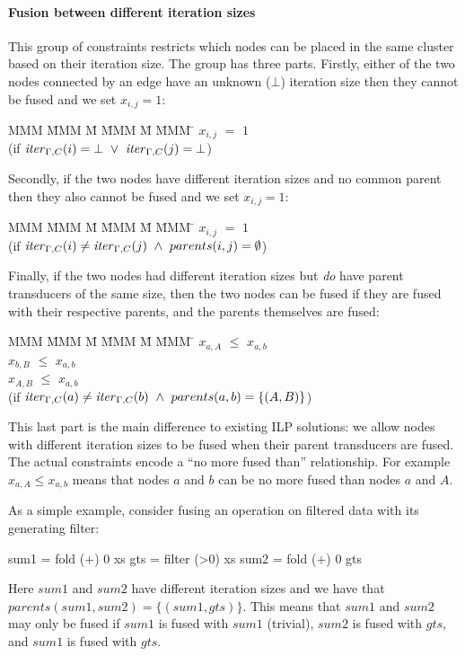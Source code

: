 \paragraph{Fusion between different iteration sizes} This group of constraints restricts which nodes can be placed in the same cluster based on their iteration size. The group has three parts. 
Firstly, either of the two nodes connected by an edge have an unknown ($\bot$) iteration size then they cannot be fused and we set $x_{i,j} = 1$:
\begin{tabbing}
MMM     \= MMM \= M \= MMM \= M \= MMM \= \kill
        \> $x_{i,j}$   \> $=$   \> $1$          \>       \>     \\
        \> (if $\mathit{iter}_{\Gamma,C}(i) = \bot 
                ~\vee~ \mathit{iter}_{\Gamma,C}(j) = \bot$)
\end{tabbing}
Secondly, if the two nodes have different iteration sizes and no common parent then they also cannot be fused and we set $x_{i,j} = 1$:
\begin{tabbing}
MMM     \= MMM \= M \= MMM \= M \= MMM \= \kill
        \> $x_{i,j}$   \> $=$   \> $1$          \>       \>     \\
        \> (if $\mathit{iter}_{\Gamma,C}(i) \not= \mathit{iter}_{\Gamma,C}(j) 
                ~\wedge~ parents(i,j) = \emptyset$)
\end{tabbing}
Finally, if the two nodes had different iteration sizes but \emph{do} have parent transducers of the same size, then the two nodes can be fused if they are fused with their respective parents, and the parents themselves are fused:
\begin{tabbing}
MMM     \= MMM \= M \= MMM \= M \= MMM \= \kill
        \> $x_{a,A}$   \> $\le$ \> $x_{a,b}$    \>       \>     \\
        \> $x_{b,B}$   \> $\le$ \> $x_{a,b}$    \>       \>     \\
        \> $x_{A,B}$   \> $\le$ \> $x_{a,b}$    \>       \>     \\
        \> (if $\mathit{iter}_{\Gamma,C}(a) \not= \mathit{iter}_{\Gamma,C}(b) 
                ~\wedge~ parents(a,b) = \{(A,B)\}$)
\end{tabbing}
This last part is the main difference to existing ILP solutions: we allow nodes with different iteration sizes to be fused when their parent transducers are fused. The actual constraints encode a ``no more fused than'' relationship. For example $x_{a,A} \le x_{a,b}$ means that nodes $a$ and $b$ can be no more fused than nodes $a$ and $A$. 

As a simple example, consider fusing an operation on filtered data with its generating filter:
\begin{code}
    sum1 = fold (+) 0  xs
    gts  = filter (>0) xs
    sum2 = fold (+) 0  gts
\end{code}
Here $sum1$ and $sum2$ have different iteration sizes and we have that $parents(sum1, sum2) = \{(sum1, gts)\}$. This means that $sum1$ and $sum2$ may only be fused if $sum1$ is fused with $sum1$ (trivial), $sum2$ is fused with $gts$, and $sum1$ is fused with $gts$.

